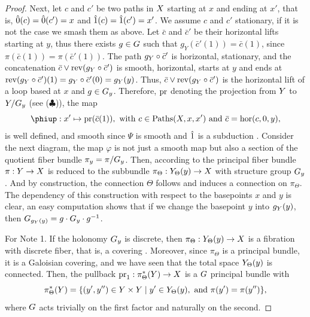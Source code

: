 \begin{proof}
  Next,
  let $c$ and $c'$ be two paths in $X$ starting at $x$ and ending at $x'$,
  that is,
  $\hat 0(c)=\hat 0(c') = x$ and $\hat 1(c) = \hat 1(c') = x'$.
  We assume $c$ and $c'$ stationary,
  if it is not the case we smash them as above.
  Let $\bar c$ and $\bar c'$ be their horizontal lifts starting at $y$,
  thus there exists $g \in G$ such that $g_Y(\bar c'(1)) = \bar c(1)$,
  since $\pi(\bar c(1)) = \pi(\bar c'(1))$.
  The path $g_Y \circ \bar c'$ is horizontal,
  stationary,
  and the concatenation $\bar c \vee \operatorname{rev}(g_Y \circ \bar c')$ is smooth,
  horizontal,
  starts at $y$ and ends at $\operatorname{rev}(g_Y \circ \bar c')(1) = g_Y \circ \bar c'(0) = g_Y(y)$.
  Thus,
  $\bar c \vee \operatorname{rev}(g_Y \circ \bar c')$ is the horizontal lift of a loop based at $x$ and $g \in G_y$.
  Therefore,
  $\mathrm{pr}$ denoting the projection from $Y$ to $Y/G_y$ (see ($\clubsuit$)),
  the map
  $$%
  \varphi : x' \mapsto \pr(\bar c(1)), \ \text{with} \ c \in \Paths(\X,x,x') \ \text{and} \ \bar c = \hor(c,0,y),
  $$%
  is well defined,
  and smooth since $\Psi$ is smooth and $\hat 1$ is a subduction . Consider the next diagram,
  the map $\varphi$ is not just a smooth map but also a section of the quotient fiber bundle $\pi_y = \pi / G_y$.
  Then,
  according to  the principal fiber bundle $\pi : Y \to X$ is reduced to the subbundle $\pi_\Theta : Y_\Theta(y) \to X$ with structure group $G_y$.
  And by construction,
  the connection $\Theta$ follows and induces a connection on $\pi_\Theta$.
  The dependency of this construction with respect to the basepoints $x$ and $y$ is clear,
  an easy computation shows that if we change the basepoint $y$ into $g_Y(y)$,
  then $G_{g_Y(y)} = g \cdot G_y \cdot g^{-1}$.
  \begin{center}
  \end{center}
  For Note 1. If the holonomy $G_y$ is discrete,
  then $\pi_\Theta : Y_\Theta(y) \to X$ is a fibration with discrete fiber,
  that is,
  a covering .
  Moreover,
  since $\pi_\Theta$ is a principal bundle,
  it is a Galoisian covering,
  and we have seen that the total space $Y_\Theta(y)$ is connected.
  Then,
  the pullback $\mathrm{pr}_1 : \pi_\Theta^*(Y) \to X$ is a $G$ principal bundle with
  $$%
  \pi_\Theta^*(\Y) = \{ (y',y'') \in \Y \times \Y \mid y' \in \Y_\Theta(y), \text{ and } \pi(y') = \pi(y'') \},
  $$%
  where $G$ acts trivially on the first factor and naturally on the second.
  

\end{proof}

